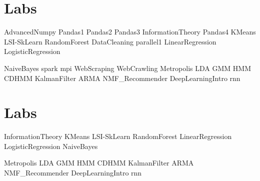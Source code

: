 \documentclass[opener-c,labs,yellow,nociteref]{HJnewsiambook}
\begin{document}
\ifbyu

\part{Labs} %
{AdvancedNumpy}
{Pandas1}
{Pandas2}
{Pandas3}
{InformationTheory}
{Pandas4}
{KMeans}
{LSI-SkLearn}
{RandomForest}
{DataCleaning}
{parallel1}
{LinearRegression}
{LogisticRegression}

{NaiveBayes}
{spark}
{mpi}
{WebScraping}
{WebCrawling}
{Metropolis}
{LDA}
{GMM}
{HMM}
{CDHMM}
{KalmanFilter}
{ARMA}
{NMF_Recommender}
{DeepLearningIntro}
{rnn}

\else 

\part{Labs} %
{InformationTheory}
{KMeans}
{LSI-SkLearn}
{RandomForest}
{LinearRegression}
{LogisticRegression}
{NaiveBayes}

{Metropolis}
{LDA}
{GMM}
{HMM}
{CDHMM}
{KalmanFilter}
{ARMA}
{NMF_Recommender}
{DeepLearningIntro}
{rnn}
\end{document}
